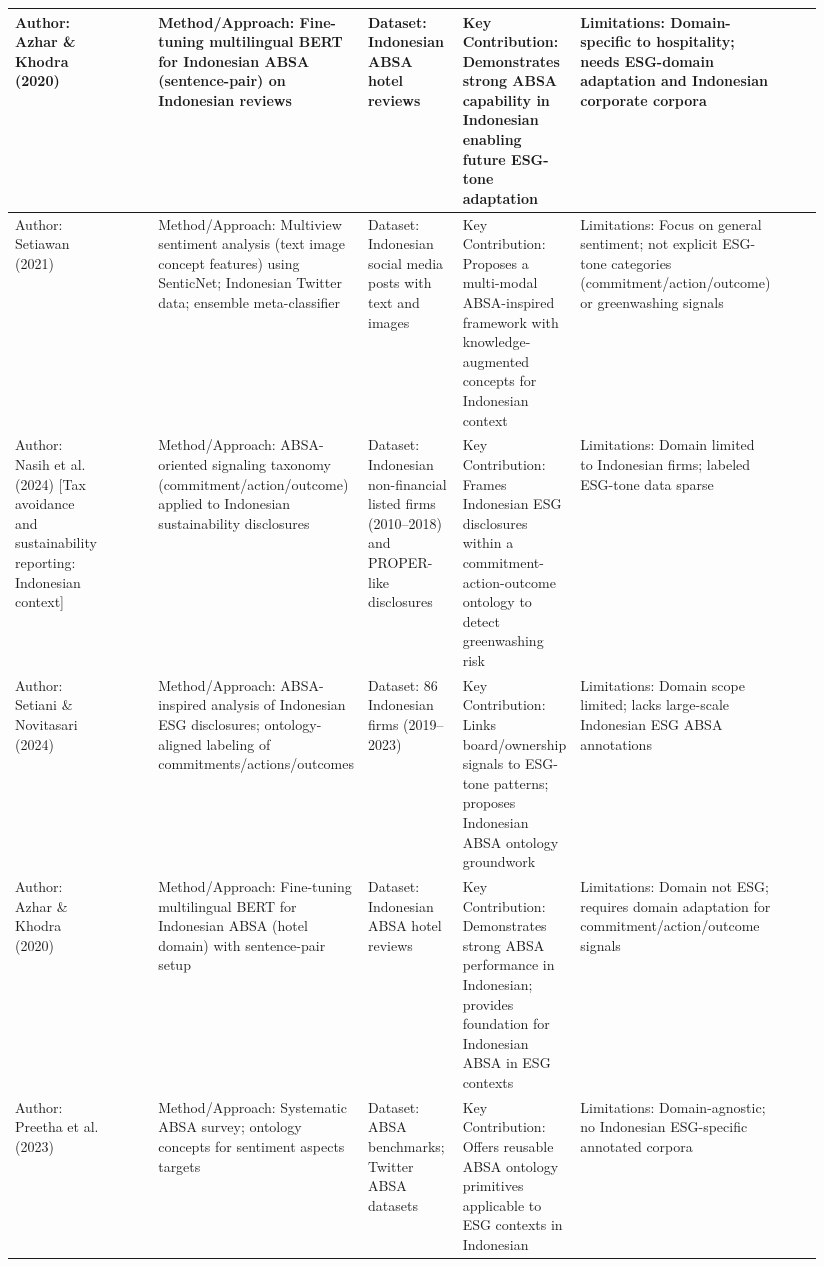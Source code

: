 \documentclass{article}
\begin{document}
\begin{landscape}
\begin{longtable}{p{0.134\linewidth} p{0.134\linewidth} p{0.134\linewidth} p{0.134\linewidth} p{0.134\linewidth} p{0.134\linewidth} p{0.134\linewidth}}
Author: Azhar \& Khodra (2020) & ~ & Method/Approach: Fine-tuning multilingual BERT for Indonesian ABSA (sentence-pair) on Indonesian reviews & Dataset: Indonesian ABSA hotel reviews & Key Contribution: Demonstrates strong ABSA capability in Indonesian enabling future ESG-tone adaptation & Limitations: Domain-specific to hospitality; needs ESG-domain adaptation and Indonesian corporate corpora \\ \hline
Author: Setiawan (2021) & ~ & Method/Approach: Multiview sentiment analysis (text image concept features) using SenticNet; Indonesian Twitter data; ensemble meta-classifier & Dataset: Indonesian social media posts with text and images & Key Contribution: Proposes a multi-modal ABSA-inspired framework with knowledge-augmented concepts for Indonesian context & Limitations: Focus on general sentiment; not explicit ESG-tone categories (commitment/action/outcome) or greenwashing signals \\ \hline
Author: Nasih et al. (2024) [Tax avoidance and sustainability reporting: Indonesian context] & ~ & Method/Approach: ABSA-oriented signaling taxonomy (commitment/action/outcome) applied to Indonesian sustainability disclosures & Dataset: Indonesian non-financial listed firms (2010–2018) and PROPER-like disclosures & Key Contribution: Frames Indonesian ESG disclosures within a commitment-action-outcome ontology to detect greenwashing risk & Limitations: Domain limited to Indonesian firms; labeled ESG-tone data sparse \\ \hline
Author: Setiani \& Novitasari (2024) & ~ & Method/Approach: ABSA-inspired analysis of Indonesian ESG disclosures; ontology-aligned labeling of commitments/actions/outcomes & Dataset: 86 Indonesian firms (2019–2023) & Key Contribution: Links board/ownership signals to ESG-tone patterns; proposes Indonesian ABSA ontology groundwork & Limitations: Domain scope limited; lacks large-scale Indonesian ESG ABSA annotations \\ \hline
Author: Azhar \& Khodra (2020) & ~ & Method/Approach: Fine-tuning multilingual BERT for Indonesian ABSA (hotel domain) with sentence-pair setup & Dataset: Indonesian ABSA hotel reviews & Key Contribution: Demonstrates strong ABSA performance in Indonesian; provides foundation for Indonesian ABSA in ESG contexts & Limitations: Domain not ESG; requires domain adaptation for commitment/action/outcome signals \\ \hline
Author: Preetha et al. (2023) & ~ & Method/Approach: Systematic ABSA survey; ontology concepts for sentiment aspects targets & Dataset: ABSA benchmarks; Twitter ABSA datasets & Key Contribution: Offers reusable ABSA ontology primitives applicable to ESG contexts in Indonesian & Limitations: Domain-agnostic; no Indonesian ESG-specific annotated corpora \\ \hline

\end{longtable}
\end{landscape}
\end{document}
